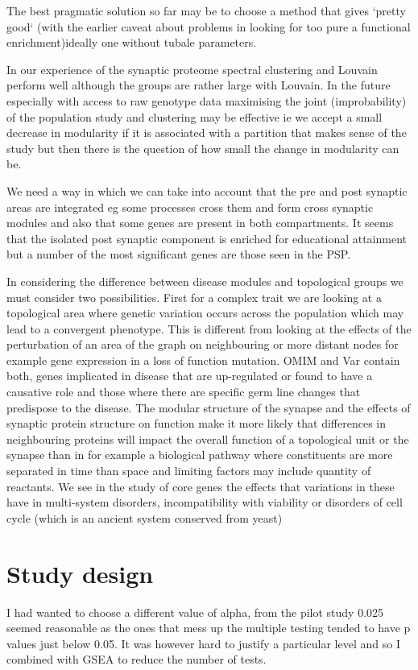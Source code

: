 The best pragmatic solution so far may be to choose a method that gives `pretty good` (with the earlier caveat about problems in looking for too pure a functional enrichment)ideally one without tubale parameters. 

In our experience of the synaptic proteome spectral clustering and Louvain perform well although the groups are rather large with Louvain. In the future especially with access to raw genotype data maximising the joint (improbability) of the population study and clustering may be effective ie we accept a small decrease in modularity if it is associated with a partition that makes sense of the study but then there is the question of how small the change in modularity can be. 



We need a way in which we can take into account that the pre and post synaptic areas are integrated eg some processes cross them and form cross synaptic modules and also that some genes are present in both compartments. It seems that the isolated post synaptic component is enriched for educational attainment but a number of the most significant genes are those seen in the PSP.

In considering the difference between disease modules and topological groups we must consider two possibilities. First for a complex trait we are looking at a topological area where genetic variation occurs across the population which may lead to a convergent phenotype. This is different from looking at the effects of the perturbation of an area of the graph on neighbouring or more distant nodes for example gene expression in a loss of function mutation. OMIM and Var contain both, genes implicated in disease that are up-regulated or found to have a causative role and those where there are specific germ line changes that predispose to the disease. The modular structure of the synapse and the effects of synaptic protein structure on function make it more likely that differences in neighbouring proteins will impact the overall function of a topological unit or the synapse than in for example a biological pathway where constituents are more separated in time than space and limiting factors may include quantity of reactants. We see in the study of core genes the effects that variations in these have in multi-system disorders, incompatibility with viability or disorders of cell cycle (which is an ancient system conserved from yeast)




\section{Study design}
I had wanted to choose a different value of alpha, from the pilot study 0.025 seemed reasonable as the ones that mess up the multiple testing tended to have p values just below 0.05. It was however hard to justify a particular level and so I combined with GSEA to reduce the number of tests. 



